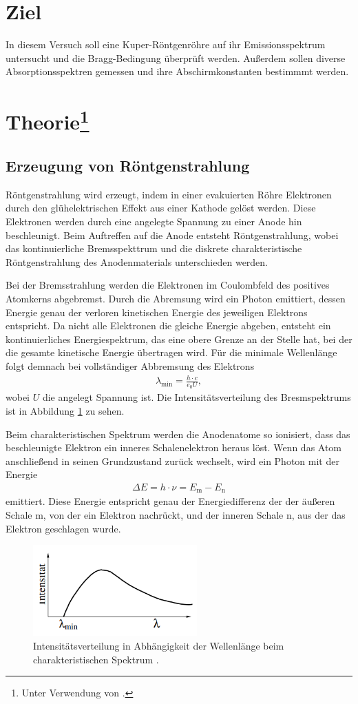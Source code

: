 \section{Ziel}
In diesem Versuch soll eine Kuper-Röntgenröhre auf ihr Emissionsspektrum untersucht und die Bragg-Bedingung überprüft werden.
Außerdem sollen diverse Absorptionsspektren gemessen und ihre Abschirmkonstanten bestimmmt werden.


\section[Theorie]{Theorie\footnote[1]{Unter Verwendung von \cite[]{man:v602}.}}

\subsection{Erzeugung von Röntgenstrahlung}
Röntgenstrahlung wird erzeugt, indem in einer evakuierten Röhre Elektronen durch den glühelektrischen Effekt aus einer Kathode gelöst werden.
Diese Elektronen werden durch eine angelegte Spannung zu einer Anode hin beschleunigt.
Beim Auftreffen auf die Anode entsteht Röntgenstrahlung, wobei das kontinuierliche Bremsspekttrum und die diskrete charakteristische Röntgenstrahlung des Anodenmaterials unterschieden werden.

\noindent
Bei der Bremsstrahlung werden die Elektronen im Coulombfeld des positives Atomkerns abgebremst.
Durch die Abremsung wird ein Photon emittiert, dessen Energie genau der verloren kinetischen Energie des jeweiligen Elektrons entspricht.
Da nicht alle Elektronen die gleiche Energie abgeben, entsteht ein kontinuierliches Energiespektrum, das eine obere Grenze an der Stelle hat,
bei der die gesamte kinetische Energie übertragen wird.
Für die minimale Wellenlänge folgt demnach bei vollständiger Abbremsung des Elektrons
\begin{align}
    \lambda_\text{min} = \frac{h \cdot c}{e_0 U},
    \label{eq:wellenlaenge}
\end{align}
wobei $U$ die angelegt Spannung ist.
Die Intensitätsverteilung des Bresmspektrums ist in Abbildung \ref{fig:bremsspektrum} zu sehen.

\noindent
Beim charakteristischen Spektrum werden die Anodenatome so ionisiert, dass das beschleunigte Elektron 
ein inneres Schalenelektron heraus löst. 
Wenn das Atom anschließend in seinen Grundzustand zurück wechselt, wird ein Photon mit der Energie 
\begin{align}
    \Delta E = h \cdot \nu = E_\text{m} - E_\text{n}
    \label{eq:energiedifferenz}
\end{align}
emittiert.
Diese Energie entspricht genau der Energiedifferenz der der äußeren Schale m, von der ein Elektron nachrückt, und der inneren Schale n,
aus der das Elektron geschlagen wurde. 

\begin{figure}[H]
    \centering
    \includegraphics[height = 3.5cm]{Abbildungen/bremsspektrum.png}
    \caption{Intensitätsverteilung in Abhängigkeit der Wellenlänge beim charakteristischen Spektrum \cite[]{man:v602}.}
    \label{fig:bremsspektrum}
\end{figure}